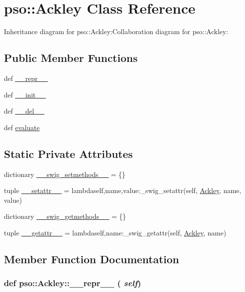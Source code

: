 \hypertarget{classpso_1_1Ackley}{
\section{pso::Ackley Class Reference}
\label{classpso_1_1Ackley}
}
Inheritance diagram for pso::Ackley:Collaboration diagram for pso::Ackley:\subsection*{Public Member Functions}
\begin{CompactItemize}
\item 
def \hyperlink{classpso_1_1Ackley_e8ad324464b4641ea1b71ba20d3fe12c}{\_\-\_\-repr\_\-\_\-}
\item 
def \hyperlink{classpso_1_1Ackley_df19f3468a7b5b260adffcd134145e24}{\_\-\_\-init\_\-\_\-}
\item 
def \hyperlink{classpso_1_1Ackley_60113ede99369f390dc78a45e625342c}{\_\-\_\-del\_\-\_\-}
\item 
def \hyperlink{classpso_1_1Ackley_bf28e608baadcbc4a9795993584f985b}{evaluate}
\end{CompactItemize}
\subsection*{Static Private Attributes}
\begin{CompactItemize}
\item 
dictionary \hyperlink{classpso_1_1Ackley_8b601c932da42d58672496d0b982e333}{\_\-\_\-swig\_\-setmethods\_\-\_\-} = \{\}
\item 
tuple \hyperlink{classpso_1_1Ackley_b19008786aca804a23b7fa7744c89c25}{\_\-\_\-setattr\_\-\_\-} = lambdaself,name,value:\_\-swig\_\-setattr(self, \hyperlink{classpso_1_1Ackley}{Ackley}, name, value)
\item 
dictionary \hyperlink{classpso_1_1Ackley_48bbde97c1ea3bf426dceed5fa9ca874}{\_\-\_\-swig\_\-getmethods\_\-\_\-} = \{\}
\item 
tuple \hyperlink{classpso_1_1Ackley_fe69fdc3d753f4c792ee79366560737c}{\_\-\_\-getattr\_\-\_\-} = lambdaself,name:\_\-swig\_\-getattr(self, \hyperlink{classpso_1_1Ackley}{Ackley}, name)
\end{CompactItemize}


\subsection{Member Function Documentation}
\hypertarget{classpso_1_1Ackley_e8ad324464b4641ea1b71ba20d3fe12c}{
\subsubsection{\setlength{\rightskip}{0pt plus 5cm}def pso::Ackley::\_\-\_\-repr\_\-\_\- ( {\em self})}}
\label{classpso_1_1Ackley_e8ad324464b4641ea1b71ba20d3fe12c}




